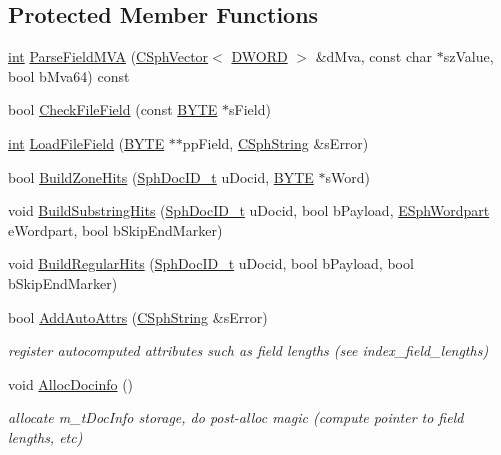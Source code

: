 \subsection*{Protected Member Functions}
\begin{DoxyCompactItemize}
\item 
\hyperlink{sphinxexpr_8cpp_a4a26e8f9cb8b736e0c4cbf4d16de985e}{int} \hyperlink{classCSphSource__Document_a928f287629828984b7ce944e6033b00a}{Parse\-Field\-M\-V\-A} (\hyperlink{classCSphVector}{C\-Sph\-Vector}$<$ \hyperlink{sphinxstd_8h_a798af1e30bc65f319c1a246cecf59e39}{D\-W\-O\-R\-D} $>$ \&d\-Mva, const char $\ast$sz\-Value, bool b\-Mva64) const 
\item 
bool \hyperlink{classCSphSource__Document_af2d5eaf2910c118face0ea1fdaf36683}{Check\-File\-Field} (const \hyperlink{sphinxstd_8h_a4ae1dab0fb4b072a66584546209e7d58}{B\-Y\-T\-E} $\ast$s\-Field)
\item 
\hyperlink{sphinxexpr_8cpp_a4a26e8f9cb8b736e0c4cbf4d16de985e}{int} \hyperlink{classCSphSource__Document_aace580bc2cb479109be39ded889629f4}{Load\-File\-Field} (\hyperlink{sphinxstd_8h_a4ae1dab0fb4b072a66584546209e7d58}{B\-Y\-T\-E} $\ast$$\ast$pp\-Field, \hyperlink{structCSphString}{C\-Sph\-String} \&s\-Error)
\item 
bool \hyperlink{classCSphSource__Document_a29a835cfb0c2121518494b0cb7cef98b}{Build\-Zone\-Hits} (\hyperlink{sphinx_8h_a3176771631c12a9e4897272003e6b447}{Sph\-Doc\-I\-D\-\_\-t} u\-Docid, \hyperlink{sphinxstd_8h_a4ae1dab0fb4b072a66584546209e7d58}{B\-Y\-T\-E} $\ast$s\-Word)
\item 
void \hyperlink{classCSphSource__Document_a09c99d374930d660876affcc248856ad}{Build\-Substring\-Hits} (\hyperlink{sphinx_8h_a3176771631c12a9e4897272003e6b447}{Sph\-Doc\-I\-D\-\_\-t} u\-Docid, bool b\-Payload, \hyperlink{sphinx_8h_a7a49c09fe68a444e69a19f051bf9b04f}{E\-Sph\-Wordpart} e\-Wordpart, bool b\-Skip\-End\-Marker)
\item 
void \hyperlink{classCSphSource__Document_aa70765256f4d17e6452f89157b070f4f}{Build\-Regular\-Hits} (\hyperlink{sphinx_8h_a3176771631c12a9e4897272003e6b447}{Sph\-Doc\-I\-D\-\_\-t} u\-Docid, bool b\-Payload, bool b\-Skip\-End\-Marker)
\item 
bool \hyperlink{classCSphSource__Document_a8be8df9cfed660e9a6addef492b261b5}{Add\-Auto\-Attrs} (\hyperlink{structCSphString}{C\-Sph\-String} \&s\-Error)
\begin{DoxyCompactList}\small\item\em register autocomputed attributes such as field lengths (see index\-\_\-field\-\_\-lengths) \end{DoxyCompactList}\item 
void \hyperlink{classCSphSource__Document_a79634f25fa1f3f0c661a6e6f1aa93ffd}{Alloc\-Docinfo} ()
\begin{DoxyCompactList}\small\item\em allocate m\-\_\-t\-Doc\-Info storage, do post-\/alloc magic (compute pointer to field lengths, etc) \end{DoxyCompactList}\end{DoxyCompactItemize}
